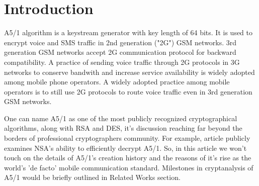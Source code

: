 \documentclass[runningheads,a4paper]{llncs}[2015/06/24]
\newcommand{\commentatside}[1]{\pdfcomment[color={0.045 0.278 0.643},icon=Note]{#1}}
\newcommand{\todo}[1]{\commentatside{#1}}
\begin{document}
\section{Introduction}\label{sec:intro}

A5/1 algorithm is a keystream generator with key length of 64 bits. It is used
to encrypt voice and SMS traffic in 2nd generation ("2G") GSM networks. 3rd
generation GSM networks accept 2G communication protocol for backward
compatibility. A practice of sending voice traffic through 2G protocols in 3G
networks to conserve bandwith and increase service availability is widely
adopted among mobile phone operators. \todo{Can't find source} A widely adopted
practice among mobile operators is to still use 2G protocols to route voice
traffic even in 3rd generation GSM networks.

One can name A5/1 as one of the most publicly recognized cryptographical
algorithms, along with RSA and DES, it's discussion reaching far beyond the
borders of professional cryptographers community. For example, article
\cite{WASHPOST} publicly examines NSA's ability to efficiently decrypt A5/1.
So, in this article we won't touch on the details of A5/1's creation history
and the reasons of it's rise as the world's 'de facto' mobile communication
standard. Milestones in cryptanalysis of A5/1 would be briefly outlined in
Related Works section.
\end{document}
